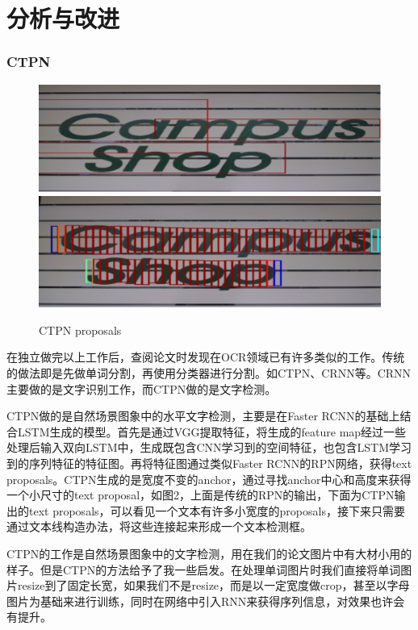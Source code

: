\chapter{分析与改进}

\subsection{CTPN}
\noindent

\begin{figure}[hp]
    \centering
    \includegraphics[scale=0.5]{rpn.eps}
    \includegraphics[scale=0.5]{ctpn.eps}
    \caption{CTPN proposals}
    \label{fig:label}
\end{figure}

在独立做完以上工作后，查阅论文时发现在OCR领域已有许多类似的工作。传统的做法即是先做单词分割，再使用分类器进行分割。如CTPN\cite{ctpn}、CRNN等。CRNN主要做的是文字识别工作，而CTPN做的是文字检测。

CTPN做的是自然场景图象中的水平文字检测，主要是在Faster RCNN的基础上结合LSTM生成的模型。首先是通过VGG提取特征，将生成的feature map经过一些处理后输入双向LSTM中，生成既包含CNN学习到的空间特征，也包含LSTM学习到的序列特征的特征图。再将特征图通过类似Faster RCNN的RPN网络，获得text proposals。CTPN生成的是宽度不变的anchor，通过寻找anchor中心和高度来获得一个小尺寸的text proposal，如图2，上面是传统的RPN的输出，下面为CTPN输出的text proposals，可以看见一个文本有许多小宽度的proposals，接下来只需要通过文本线构造办法，将这些连接起来形成一个文本检测框。

CTPN的工作是自然场景图象中的文字检测，用在我们的论文图片中有大材小用的样子。但是CTPN的方法给予了我一些启发。在处理单词图片时我们直接将单词图片resize到了固定长宽，如果我们不是resize，而是以一定宽度做crop，甚至以字母图片为基础来进行训练，同时在网络中引入RNN来获得序列信息，对效果也许会有提升。
